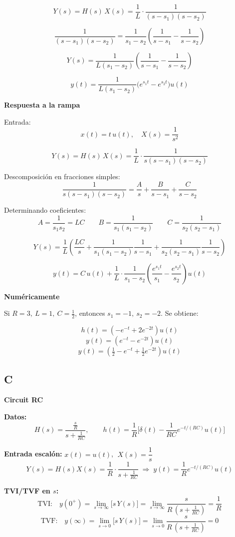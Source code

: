 \[
Y(s) = H(s)\,X(s) = \frac{1}{L}\cdot\frac{1}{(s-s_1)(s-s_2)}
\]

\[
\frac{1}{(s-s_1)(s-s_2)} = \frac{1}{s_1-s_2}\left(\frac{1}{s-s_1}-\frac{1}{s-s_2}\right)
\]

\[
Y(s) = \frac{1}{L(s_1-s_2)}\left(\frac{1}{s-s_1}-\frac{1}{s-s_2}\right)
\]

\[
y(t) = \frac{1}{L(s_1-s_2)}\Big(e^{s_1 t}-e^{s_2 t}\Big)u(t)
\]

\textbf{Respuesta a la rampa}

Entrada:
\[
x(t)=t\,u(t), \quad X(s)=\frac{1}{s^2}
\]

\[
Y(s)=H(s)\,X(s)=\frac{1}{L}\cdot\frac{1}{s(s-s_1)(s-s_2)}
\]

Descomposición en fracciones simples:
\[
\frac{1}{s(s-s_1)(s-s_2)}=\frac{A}{s}+\frac{B}{s-s_1}+\frac{C}{s-s_2}
\]

Determinando coeficientes:
\[
A=\frac{1}{s_1 s_2}=LC \qquad
B=\frac{1}{s_1(s_1-s_2)} \qquad
C=\frac{1}{s_2(s_2-s_1)}
\]

\[
Y(s)=\frac{1}{L}\left(\frac{LC}{s}+\frac{1}{s_1(s_1-s_2)}\frac{1}{s-s_1}+\frac{1}{s_2(s_2-s_1)}\frac{1}{s-s_2}\right)
\]

\[
y(t)=C\,u(t)+\frac{1}{L}\cdot\frac{1}{s_1-s_2}\left(\frac{e^{s_1 t}}{s_1}-\frac{e^{s_2 t}}{s_2}\right)u(t)
\]

\textbf{Numéricamente}

Si \(R=3,\ L=1,\ C=\tfrac{1}{2}\), entonces \(s_1=-1,\ s_2=-2\). Se obtiene:

\[
h(t)=(-e^{-t}+2e^{-2t})u(t)
\]
\[
y(t)=(e^{-t}-e^{-2t})u(t)
\]
\[
y(t)=\left(\tfrac{1}{2}-e^{-t}+\tfrac{1}{2}e^{-2t}\right)u(t)
\]

\subsection{C}

\textbf{Circuit RC}

\textbf{Datos:}
\[
H(s)=\frac{\tfrac{s}{R}}{s+\tfrac{1}{RC}},\qquad
h(t)=\frac{1}{R}\Big[\delta(t)-\frac{1}{RC}e^{-t/(RC)}u(t)\Big]
\]

\textbf{Entrada escalón:} \(x(t)=u(t)\), \(\;X(s)=\dfrac{1}{s}\)
\[
Y(s)=H(s)X(s)=\frac{1}{R}\cdot\frac{1}{s+\tfrac{1}{RC}}
\;\Rightarrow\;
y(t)=\frac{1}{R}e^{-t/(RC)}u(t)
\]

\textbf{TVI/TVF en \(s\):}
\[
\text{TVI:}\quad y(0^+)=\lim_{s\to\infty}\big[s\,Y(s)\big]
=\lim_{s\to\infty}\frac{s}{R\,(s+\tfrac{1}{RC})}=\frac{1}{R}
\]
\[
\text{TVF:}\quad y(\infty)=\lim_{s\to 0}\big[s\,Y(s)\big]
=\lim_{s\to 0}\frac{s}{R\,(s+\tfrac{1}{RC})}=0
\]

